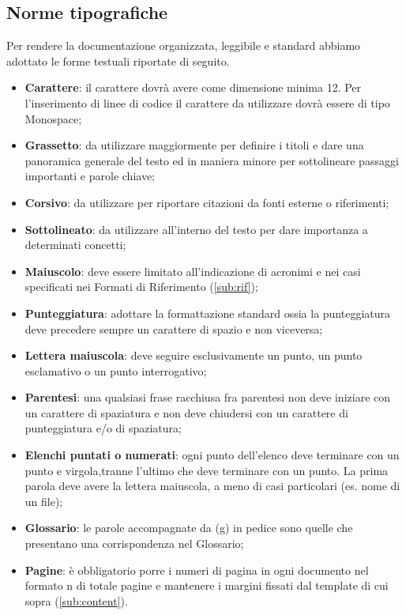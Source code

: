 {		\subsection{Norme tipografiche}{
			\label{sub:typo}
			Per rendere la documentazione organizzata, leggibile e standard abbiamo adottato le forme testuali riportate di seguito.
			\begin{itemize}
				\item \textbf{Carattere}: il carattere dovr\`{a} avere come dimensione minima 12. Per l'inserimento di linee di codice il carattere da utilizzare dovr\`{a} essere di tipo Monospace;
				\item \textbf{Grassetto}: da utilizzare maggiormente per definire i titoli e dare una panoramica generale del testo ed in maniera minore per sottolineare passaggi importanti e parole chiave;
				\item \textbf{Corsivo}: da utilizzare per riportare citazioni da fonti esterne o riferimenti;
				\item \textbf{Sottolineato}: da utilizzare all'interno del testo per dare importanza a determinati concetti;
				\item \textbf{Maiuscolo}: deve essere limitato all’indicazione di acronimi e nei casi specificati nei Formati di Riferimento (\ref{sub:rif});
				\item \textbf{Punteggiatura}: adottare la formattazione standard ossia la punteggiatura deve precedere sempre un carattere di spazio e non viceversa;
				\item \textbf{Lettera maiuscola}: deve seguire esclusivamente un punto, un punto esclamativo o un punto interrogativo;
				\item \textbf{Parentesi}: una qualsiasi frase racchiusa fra parentesi non deve iniziare con un carattere di spaziatura e non deve chiudersi con un carattere di punteggiatura e/o di spaziatura;
				\item \textbf{Elenchi puntati o numerati}: ogni punto dell’elenco deve terminare con un punto e virgola,tranne l’ultimo che deve terminare con un punto. La prima parola deve avere la lettera maiuscola, a meno di casi particolari (es. nome di un file);
				\item \textbf{Glossario}: le parole accompagnate da (g) in pedice sono quelle che presentano una corrispondenza nel Glossario;
				\item \textbf{Pagine}: \`{e} obbligatorio porre i numeri di pagina in ogni documento nel formato {n} di {totale pagine} e mantenere i margini fissati dal template di cui sopra (\ref{sub:content}).
			\end{itemize}
		}
}
